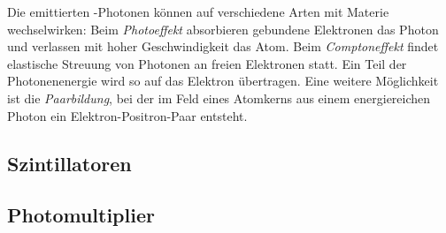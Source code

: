 Die emittierten \textgamma-Photonen können auf verschiedene Arten mit Materie wechselwirken:
Beim \emph{Photoeffekt} absorbieren gebundene Elektronen das Photon und verlassen mit hoher Geschwindigkeit das Atom.
Beim \emph{Comptoneffekt} findet elastische Streuung von Photonen an freien Elektronen statt.
Ein Teil der Photonenenergie wird so auf das Elektron übertragen.
Eine weitere Möglichkeit ist die \emph{Paarbildung}, bei der im Feld eines Atomkerns aus einem energiereichen
Photon ein Elektron-Positron-Paar entsteht.



\subsection{Szintillatoren}




\subsection{Photomultiplier}